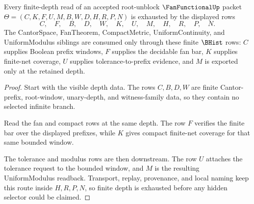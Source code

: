 \begin{theorem}
\label{thm:fanfunctional-root-finite-depth-exhaustion}
Every finite-depth read of an accepted root-unblock $\FanFunctionalUp$ packet $\Theta=(C,K,F,U,M,B,W,D,H,R,P,N)$ is exhausted by the displayed rows
$$
C,\quad F,\quad B,\quad D,\quad W,\quad K,\quad U,\quad M,\quad H,\quad R,\quad P,\quad N.
$$
The CantorSpace, FanTheorem, CompactMetric, UniformContinuity, and UniformModulus siblings are consumed only through these finite $\BHist$ rows: $C$ supplies Boolean prefix windows, $F$ supplies the decidable fan bar, $K$ supplies finite-net coverage, $U$ supplies tolerance-to-prefix evidence, and $M$ is exported only at the retained depth.
\end{theorem}
\begin{proof}
Start with the visible depth data. The rows $C,B,D,W$ are finite Cantor-prefix, root-window, unary-depth, and witness-family data, so they contain no selected infinite branch.

Read the fan and compact rows at the same depth. The row $F$ verifies the finite bar over the displayed prefixes, while $K$ gives compact finite-net coverage for that same bounded window.

The tolerance and modulus rows are then downstream. The row $U$ attaches the tolerance request to the bounded window, and $M$ is the resulting UniformModulus readback. Transport, replay, provenance, and local naming keep this route inside $H,R,P,N$, so finite depth is exhausted before any hidden selector could be claimed.
\end{proof}

